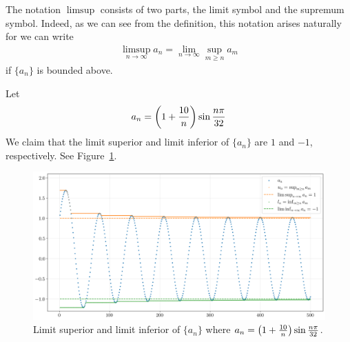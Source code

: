 \documentclass[thmcnt=section, 12pt]{my-elegantbook}
\begin{document}
\begin{note}
    The notation $\limsup$ consists of two parts, the limit symbol and the supremum symbol. Indeed, as we can see from the definition, this notation arises naturally for we can write
    \begin{align*}
        \limsup_{n \to \infty} a_n
        = \lim_{n \to \infty} \sup_{m \geq n} a_m
    \end{align*}
    if $\{a_n\}$ is bounded above.
\end{note}

\begin{example}
    Let
    \begin{align*}
        a_n = \left( 1 + \frac{10}{n} \right) \sin \frac{n \pi}{32}
    \end{align*}
    We claim that the limit superior and limit inferior of $\{a_n\}$ are $1$ and $-1$, respectively. See Figure~\ref{fig:12}.

    \begin{figure}[ht]
        \centering
        \includegraphics[scale=0.4]{figures/limsup-liminf.png}
        \caption{Limit superior and limit inferior of $\{a_n\}$ where $a_n = \left( 1 + \frac{10}{n} \right) \sin \frac{n \pi}{32}$.}
        \label{fig:12}
    \end{figure}


\end{example}
\end{document}
